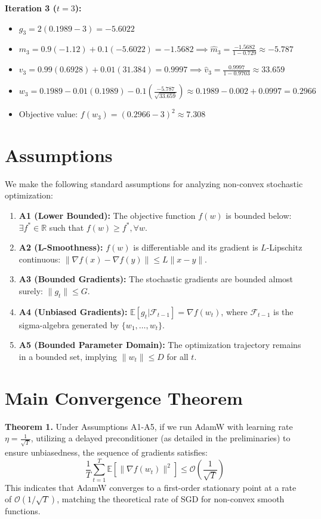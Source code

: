 \documentclass[11pt]{article}
\begin{document}
\textbf{Iteration 3 ($t=3$):}
\begin{itemize}
    \item $g_3 = 2(0.1989-3) = -5.6022$
    \item $m_3 = 0.9(-1.12) + 0.1(-5.6022) = -1.5682 \implies \hat{m}_3 = \frac{-1.5682}{1-0.729} \approx -5.787$
    \item $v_3 = 0.99(0.6928) + 0.01(31.384) = 0.9997 \implies \hat{v}_3 = \frac{0.9997}{1-0.9703} \approx 33.659$
    \item $w_3 = 0.1989 - 0.01(0.1989) - 0.1 \left(\frac{-5.787}{\sqrt{33.659}}\right) \approx 0.1989 - 0.002 + 0.0997 = 0.2966$
    \item Objective value: $f(w_3) = (0.2966-3)^2 \approx 7.308$
\end{itemize}

\section*{Assumptions}
We make the following standard assumptions for analyzing non-convex stochastic optimization:
\begin{enumerate}
    \item \textbf{A1 (Lower Bounded):} The objective function $f(w)$ is bounded below: $\exists f^* \in \mathbb{R}$ such that $f(w) \geq f^*, \forall w$.
    \item \textbf{A2 (L-Smoothness):} $f(w)$ is differentiable and its gradient is $L$-Lipschitz continuous: $\|\nabla f(x) - \nabla f(y)\| \leq L\|x-y\|$.
    \item \textbf{A3 (Bounded Gradients):} The stochastic gradients are bounded almost surely: $\|g_t\| \leq G$.
    \item \textbf{A4 (Unbiased Gradients):} $\mathbb{E}[g_t | \mathcal{F}_{t-1}] = \nabla f(w_t)$, where $\mathcal{F}_{t-1}$ is the sigma-algebra generated by $\{w_1, \dots, w_t\}$.
    \item \textbf{A5 (Bounded Parameter Domain):} The optimization trajectory remains in a bounded set, implying $\|w_t\| \leq D$ for all $t$.
\end{enumerate}

\section*{Main Convergence Theorem}
\textbf{Theorem 1.} Under Assumptions A1-A5, if we run AdamW with learning rate $\eta = \frac{1}{\sqrt{T}}$, utilizing a delayed preconditioner (as detailed in the preliminaries) to ensure unbiasedness, the sequence of gradients satisfies:
\begin{equation}
    \frac{1}{T} \sum_{t=1}^T \mathbb{E}[\|\nabla f(w_t)\|^2] \leq \mathcal{O}\left(\frac{1}{\sqrt{T}}\right)
\end{equation}
This indicates that AdamW converges to a first-order stationary point at a rate of $\mathcal{O}(1/\sqrt{T})$, matching the theoretical rate of SGD for non-convex smooth functions.
\end{document}
